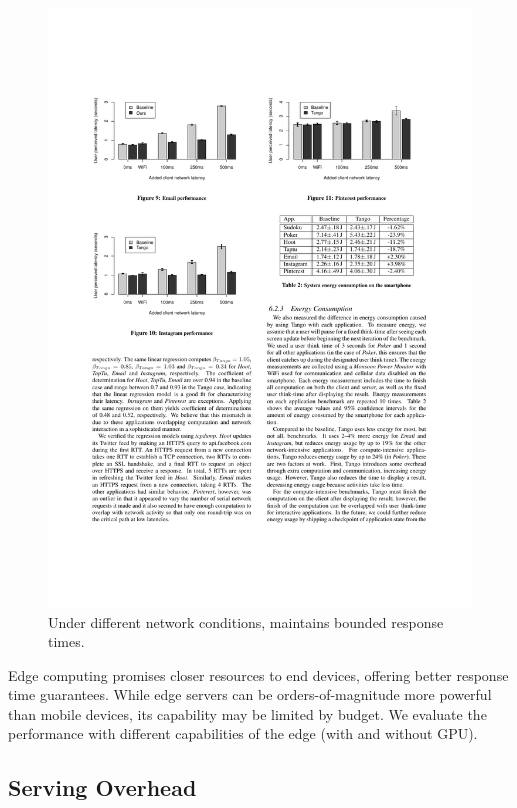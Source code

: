\begin{figure}
  \centering
  \includegraphics[width=0.95\columnwidth]{figures/eval-net-conditions.pdf}
  \caption{Under different network conditions, \sysname{} maintains bounded
    response times.}
  \label{fig:end-to-end}
\end{figure}

\newpage

Edge computing promises closer resources to end devices, offering better
response time guarantees. While edge servers can be orders-of-magnitude more
powerful than mobile devices, its capability may be limited by budget. We
evaluate the performance \sysname{} with different capabilities of the edge
(with and without GPU).

\subsection*{Serving Overhead}
\label{sec:serving-overhead}

